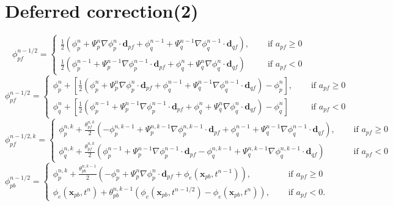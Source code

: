 \documentclass{article}
\begin{document}
\section{Deferred correction(2)}
\[ \phi_{pf}^{n-1/2} =
\begin{cases}
	\frac{1}{2}(\phi_p^{n} + \Psi_p^{n}\nabla\phi_p^{n}\cdot\boldsymbol{d}_{pf}
	+
	\phi_q^{n-1} + \Psi_q^{n-1}\nabla\phi_q^{n-1}\cdot\boldsymbol{d}_{qf}), \quad &\text{ if } a_{pf} \geq 0 \\
	\frac{1}{2}(\phi_p^{n-1} + \Psi_p^{n-1}\nabla\phi_p^{n-1}\cdot\boldsymbol{d}_{pf}
	+
	\phi_q^{n} + \Psi_q^{n}\nabla\phi_q^{n}\cdot\boldsymbol{d}_{qf}) \quad &\text{ if } a_{pf} < 0
\end{cases} \]
\[ \phi_{pf}^{n-1/2} =
\begin{cases}
	\phi_p^{n} + 
	[\frac{1}{2}(\phi_p^{n} + \Psi_p^{n}\nabla\phi_p^{n}\cdot\boldsymbol{d}_{pf}
	+
	\phi_q^{n-1} + \Psi_q^{n-1}\nabla\phi_q^{n-1}\cdot\boldsymbol{d}_{qf}) - \phi_p^{n}], \quad &\text{ if } a_{pf} \geq 0 \\
	\phi_q^{n} + 
	[\frac{1}{2}(\phi_p^{n-1} + \Psi_p^{n-1}\nabla\phi_p^{n-1}\cdot\boldsymbol{d}_{pf}
	+ \phi_q^{n} + \Psi_q^{n}\nabla\phi_q^{n}\cdot\boldsymbol{d}_{qf}) - \phi_q^{n}] \quad &\text{ if } a_{pf} < 0
\end{cases} \]
\[ \phi_{pf}^{n-1/2, k} =
\begin{cases}
	\phi_p^{n, k} + 
	\frac{\theta_{pf}^{n,k}}{2}(-\phi_p^{n, k-1} + \Psi_p^{n, k-1}\nabla\phi_p^{n, k-1}\cdot\boldsymbol{d}_{pf}
	+
	\phi_q^{n-1} + \Psi_q^{n-1}\nabla\phi_q^{n-1}\cdot\boldsymbol{d}_{qf}), \quad &\text{ if } a_{pf} \geq 0 \\
	\phi_q^{n, k} + 
	\frac{\theta_{pf}^{n,k}}{2}(\phi_p^{n-1} + \Psi_p^{n-1}\nabla\phi_p^{n-1}\cdot\boldsymbol{d}_{pf}
	- \phi_q^{n, k-1} + \Psi_q^{n, k-1}\nabla\phi_q^{n, k-1}\cdot\boldsymbol{d}_{qf}) \quad &\text{ if } a_{pf} < 0
\end{cases} \]
\[ \phi_{pb}^{n-1/2} =
\begin{cases}
	\phi_p^{n,k} + \frac{\theta_{pb}^{n,k-1}}{2}(-\phi_p^{n} + \Psi_p^{n}\nabla\phi_p^{n}\cdot\boldsymbol{d}_{pf}
	+
	\phi_e(\boldsymbol{x}_{pb}, t^{n-1})), \quad &\text{ if } a_{pf} \geq 0 \\
	\phi_e(\boldsymbol{x}_{pb}, t^{n}) + \theta_{pb}^{n,k-1}(\phi_e(\boldsymbol{x}_{pb}, t^{n-1/2}) - \phi_e(\boldsymbol{x}_{pb}, t^{n})),\quad &\text{ if } a_{pf} < 0.
\end{cases} \]
\end{document}
